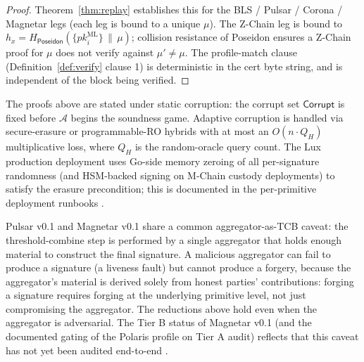\begin{proof}
Theorem~\ref{thm:replay} establishes this for the BLS / Pulsar /
Corona / Magnetar legs (each leg is bound to a unique $\mu$). The
Z-Chain leg is bound to $h_x = H_{\mathsf{Poseidon}}(\{\mathit{pk}_i^{\mathrm{ML}}\}
\,\|\, \mu)$; collision resistance of Poseidon \cite{poseidon} ensures
a Z-Chain proof for $\mu$ does not verify against $\mu' \neq \mu$.
The profile-match clause (Definition~\ref{def:verify} clause 1) is
deterministic in the cert byte string, and is independent of the
block being verified.
\end{proof}

\begin{remark}
The proofs above are stated under static corruption: the corrupt set
$\mathsf{Corrupt}$ is fixed before $\mathcal{A}$ begins the soundness
game. Adaptive corruption is handled via secure-erasure or
programmable-RO hybrids \cite{fischlin2005} with at most an
$O(n \cdot Q_H)$ multiplicative loss, where $Q_H$ is the random-oracle
query count. The Lux production deployment uses Go-side memory
zeroing of all per-signature randomness (and HSM-backed signing on
M-Chain custody deployments) to satisfy the erasure precondition;
this is documented in the per-primitive deployment runbooks
\cite{pulsar,corona,magnetar}.
\end{remark}

\begin{remark}
Pulsar v0.1 and Magnetar v0.1 share a common aggregator-as-TCB caveat:
the threshold-combine step is performed by a single aggregator that
holds enough material to construct the final signature. A malicious
aggregator can fail to produce a signature (a liveness fault) but
cannot produce a forgery, because the aggregator's material is
derived solely from honest parties' contributions: forging a
signature requires forging at the underlying primitive level, not
just compromising the aggregator. The reductions above hold even
when the aggregator is adversarial. The Tier B status of Magnetar
v0.1 (and the documented gating of the Polaris profile on Tier A
audit) reflects that this caveat has not yet been audited
end-to-end \cite{magnetar}.
\end{remark}
